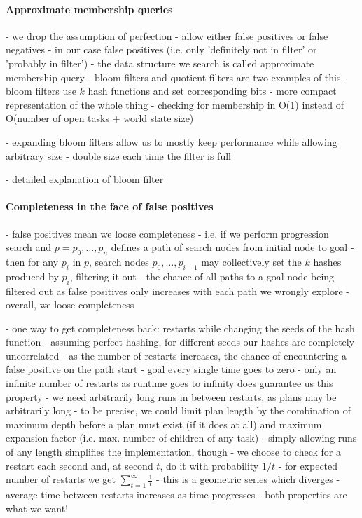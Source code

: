 \paragraph{Approximate membership queries}
- we drop the assumption of perfection
- allow either false positives or false negatives
- in our case false positives (i.e. only 'definitely not in filter' or 'probably in filter')
- the data structure we search is called approximate membership query
- bloom filters and quotient filters are two examples of this
- bloom filters use $k$ hash functions and set corresponding bits
- more compact representation of the whole thing
- checking for membership in O(1) instead of O(number of open tasks + world state size)

- expanding bloom filters allow us to mostly keep performance while allowing arbitrary size
- double size each time the filter is full

- detailed explanation of bloom filter

\paragraph{Completeness in the face of false positives}
- false positives mean we loose completeness
- i.e. if we perform progression search and $p = p_0, \ldots, p_n$ defines a path of search nodes from initial node to goal
- then for any $p_i$ in $p$, search nodes $p_0, \ldots, p_{i-1}$ may collectively set the $k$ hashes produced by $p_i$, filtering it out
- the chance of all paths to a goal node being filtered out as false positives only increases with each path we wrongly explore
- overall, we loose completeness

- one way to get completeness back: restarts while changing the seeds of the hash function
- assuming perfect hashing, for different seeds our hashes are completely uncorrelated
- as the number of restarts increases, the chance of encountering a false positive on the path start - goal every single time goes to zero
- only an infinite number of restarts as runtime goes to infinity does guarantee us this property
- we need arbitrarily long runs in between restarts, as plans may be arbitrarily long
	- to be precise, we could limit plan length by the combination of maximum depth before a plan must exist (if it does at all) and maximum expansion factor (i.e. max. number of children of any task)
	- simply allowing runs of any length simplifies the implementation, though
- we choose to check for a restart each second and, at second $t$, do it with probability $1 / t$
- for expected number of restarts we get $\sum_{t=1}^{\infty} \frac{1}{t}$
	- this is a geometric series which diverges
	- average time between restarts increases as time progresses
	- both properties are what we want!


